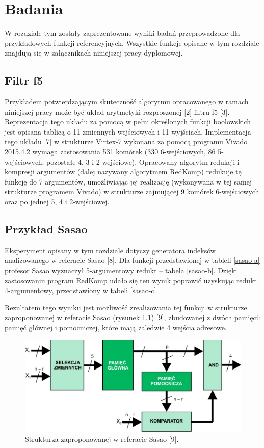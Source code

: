 \chapter{Badania}
\label{chapter:research}

W rozdziale tym zostały zaprezentowane wyniki badań przeprowadzone dla przykładowych funkcji referencyjnych.
Wszystkie funkcje opisane w tym rozdziale znajdują się w załącznikach niniejszej pracy dyplomowej.

\section{Filtr f5}

Przykładem potwierdzającym skuteczność algorytmu opracowanego w ramach niniejszej pracy
może być układ arytmetyki rozproszonej [2] filtru f5 [3].
Reprezentacja tego układu za pomocą w pełni określonych funkcji boolowskich
jest opisana tablicą o 11 zmiennych wejściowych i 11 wyjściach.
Implementacja tego układu [7] w strukturze Virtex-7 wykonana za pomocą programu Vivado 2015.4.2
wymaga zastosowania 531 komórek (330 6-wejściowych, 86 5-wejściowych; pozostałe 4, 3 i 2-wejściowe).
Opracowany algorytm redukcji i kompresji argumentów (dalej nazywany algorytmem RedKomp)
redukuje tę funkcję do 7 argumentów,
umożliwiając jej realizację
(wykonywana w tej samej strukturze programem Vivado)
w strukturze zajmującej 9 komórek 6-wejściowych oraz po jednej 5, 4 i 2-wejściowej.

\section{Przykład Sasao}

Eksperyment opisany w tym rozdziale dotyczy generatora indeksów analizowanego w referacie Sasao [8].
Dla funkcji przedstawionej w tableli \ref{sasao-a} profesor Sasao wyznaczył 5-argumentowy redukt – tabela \ref{sasao-b}.
Dzięki zastosowaniu program RedKomp udało się ten wynik poprawić uzyskując redukt 4-argumentowy,
przedstawiony w tabeli \ref{sasao-c}.



Rezultatem tego wyniku jest możliwość zrealizowania tej funkcji w strukturze zaproponowanej w referacie Sasao (rysunek \ref{fig:sasao-structure}) [9],
zbudowanej z dwóch pamięci: pamięć głównej i pomocniczej,
które mają zaledwie 4 wejścia adresowe.

\begin{figure}[H]
\centering
\includegraphics[width = 13cm]{chapter04/sasao-structure.jpg}
\caption{Strukturza zaproponowanej w referacie Sasao [9].}
\label{fig:sasao-structure}
\end{figure}

